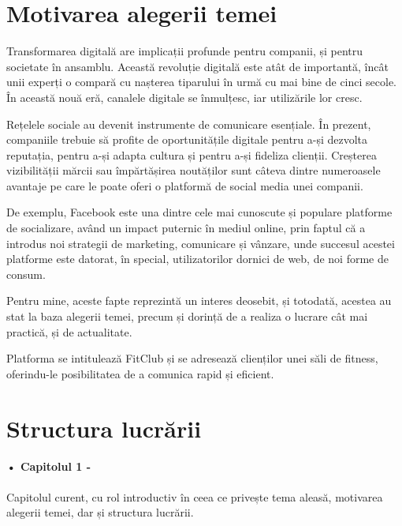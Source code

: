 \section{Motivarea alegerii temei}

Transformarea digitală are implicații profunde pentru companii, și pentru societate în ansamblu. Această revoluție digitală este atât de importantă, încât unii experți o compară cu nașterea tiparului în urmă cu mai bine de cinci secole. În această nouă eră, canalele digitale se înmulțesc, iar utilizările lor cresc.\newline
 
Rețelele sociale au devenit instrumente de comunicare esențiale. În prezent, companiile trebuie să profite de oportunitățile digitale pentru a-și dezvolta reputația, pentru a-și adapta cultura și pentru a-și fideliza clienții. Creșterea vizibilității mărcii sau împărtășirea noutăților sunt câteva dintre numeroasele avantaje pe care le poate oferi o platformă de social media unei companii.\newline
 
De exemplu, Facebook este una dintre cele mai cunoscute și populare platforme de socializare, având un impact puternic în mediul online, prin faptul că a introdus noi strategii de marketing, comunicare și vânzare, unde succesul acestei platforme este datorat, în special, utilizatorilor dornici de web, de noi forme de consum.\newline

Pentru mine, aceste fapte reprezintă un interes deosebit, și totodată, acestea au stat la baza alegerii temei, precum și dorință de a realiza o lucrare cât mai practică, și de actualitate.\newline

Platforma se intitulează FitClub și se adresează clienților unei săli de fitness, oferindu-le posibilitatea de a comunica rapid și eficient.\newline

\section{Structura lucrării}

\paragraph{• Capitolul 1 -}Capitolul curent, cu rol introductiv în ceea ce privește tema aleasă, motivarea alegerii temei, dar și structura lucrării.

